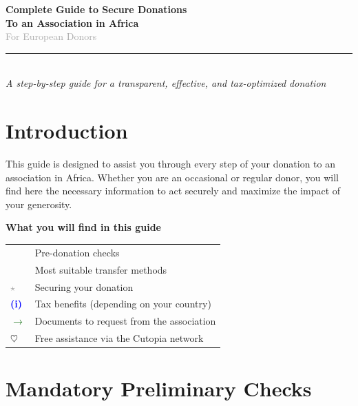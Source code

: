 \documentclass[12pt, a4paper]{article}
\newcommand{\cmark}{\textcolor{darkgreen}{\textbf{\checkmark}}}
\newcommand{\arrow}{\textcolor{darkgreen}{\textbf{$\rightarrow$}}}
\newcommand{\heart}{\textcolor{cutopia}{\textbf{$\heartsuit$}}}
\newcommand{\starred}{\textcolor{darkgray}{\textbf{$\star$}}}
\newcommand{\euro}{\textcolor{darkgreen}{\textbf{\EUR}}}
\newcommand{\info}{\textcolor{blue}{\textbf{(i)}}}
\begin{document}
\begin{center}
    {\Huge \textbf{Complete Guide to Secure Donations}} \\[0.3cm]
    {\Large \textbf{To an Association in Africa}} \\[0.3cm]
    {\large \textcolor{darkgray}{For European Donors}} \\[0.5cm]
    \rule{0.7\textwidth}{0.4pt} \\[0.3cm]
    \textit{A step-by-step guide for a transparent, effective, and tax-optimized donation}
\end{center}

\vspace{0.5cm}

\tableofcontents
\newpage

\section*{Introduction}
This guide is designed to assist you through every step of your donation to an association in Africa. Whether you are an occasional or regular donor, you will find here the necessary information to act securely and maximize the impact of your generosity.

\vspace{0.3cm}
\begin{resumebox}
    \centering
    \textbf{\Large What you will find in this guide} \\[0.3cm]
    \begin{tabular}{ll}
        \cmark & Pre-donation checks \\
        \euro & Most suitable transfer methods \\
        \starred & Securing your donation \\
        \info & Tax benefits (depending on your country) \\
        \arrow & Documents to request from the association \\
        \heart & Free assistance via the Cutopia network
    \end{tabular}
\end{resumebox}
\vspace{0.3cm}

\newpage

\section{Mandatory Preliminary Checks}
\end{document}
